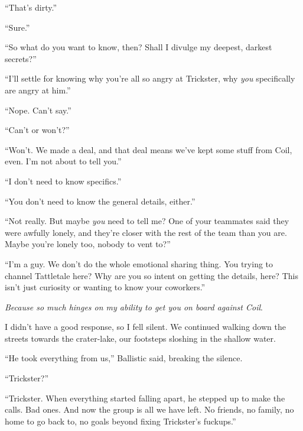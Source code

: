 ``That's dirty.''



``Sure.''



``So what do you want to know, then?  Shall I divulge my deepest, darkest secrets?''



``I'll settle for knowing why you're all so angry at Trickster, why \emph{you} specifically are angry at him.''



``Nope.  Can't say.''



``Can't or won't?''



``Won't.  We made a deal, and that deal means we've kept some stuff from Coil, even.  I'm not about to tell you.''



``I don't need to know specifics.''



``You don't need to know the general details, either.''



``Not really.  But maybe \emph{you} need to tell me?  One of your teammates said they were awfully lonely, and they're closer with the rest of the team than you are.  Maybe you're lonely too, nobody to vent to?''



``I'm a guy.  We don't do the whole emotional sharing thing.  You trying to channel Tattletale here?  Why are you so intent on getting the details, here?  This isn't just curiosity or wanting to know your coworkers.''



\emph{Because so much hinges on my ability to get you on board against Coil}.



I didn't have a good response, so I fell silent.  We continued walking down the streets towards the crater-lake, our footsteps sloshing in the shallow water.



``He took everything from us,'' Ballistic said, breaking the silence.



``Trickster?''



``Trickster.  When everything started falling apart, he stepped up to make the calls.  Bad ones.  And now the group is all we have left.  No friends, no family, no home to go back to, no goals beyond fixing Trickster's fuckups.''



